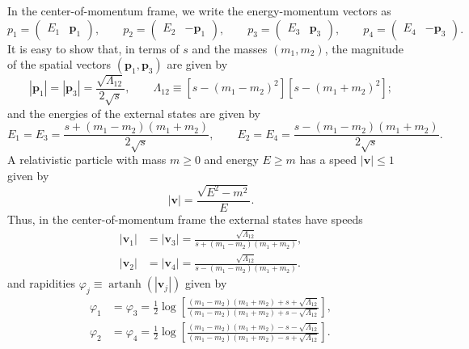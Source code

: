 In the center-of-momentum frame, we write the energy-momentum vectors as
\begin{equation}
	p_{1} = \begin{pmatrix} E_{1} & \mathbf{p}_{1} \end{pmatrix}, \qquad p_{2} = \begin{pmatrix} E_{2} & -\mathbf{p}_{1} \end{pmatrix}, \qquad p_{3} = \begin{pmatrix} E_{3} & \mathbf{p}_{3} \end{pmatrix}, \qquad p_{4} = \begin{pmatrix} E_{4} & -\mathbf{p}_{3} \end{pmatrix}.
\end{equation}
It is easy to show that, in terms of $s$ and the masses $(m_{1}, m_{2})$, the magnitude of the spatial vectors $(\mathbf{p}_{1}, \mathbf{p}_{3})$ are given by
\begin{equation}
	|\mathbf{p}_{1}| = |\mathbf{p}_{3}| = \frac{\sqrt{\Lambda_{12}}}{2 \sqrt{s}}, \qquad \Lambda_{12} \equiv \left[s - (m_{1} - m_{2})^{2} \right] \left[s - (m_{1} + m_{2})^{2} \right];
	\label{2Momenta}
\end{equation}
and the energies of the external states are given by
\begin{equation}
	E_{1} = E_{3} = \frac{s + (m_{1} - m_{2})(m_{1} + m_{2})}{2 \sqrt{s}}, \qquad E_{2} = E_{4} = \frac{s - (m_{1} - m_{2})(m_{1} + m_{2})}{2 \sqrt{s}}.
	\label{4Energies}
\end{equation}
A relativistic particle with mass $m \geq 0$ and energy $E \geq m$ has a speed $|\mathbf{v}| \leq 1$ given by
\begin{equation}
	|\mathbf{v}| = \frac{\sqrt{E^{2} - m^{2}}}{E}.
\end{equation}
Thus, in the center-of-momentum frame the external states have speeds
\begin{equation}
\begin{split}
	|\mathbf{v}_{1}| &= |\mathbf{v}_{3}| = \frac{\sqrt{\Lambda_{12}}}{s + (m_{1} - m_{2})(m_{1} + m_{2})}, \\
	|\mathbf{v}_{2}| &= |\mathbf{v}_{4}| = \frac{\sqrt{\Lambda_{12}}}{s - (m_{1} - m_{2})(m_{1} + m_{2})}.
\end{split} \label{4Speeds}
\end{equation}
and rapidities $\varphi_{j} \equiv \operatorname{artanh}{(|\mathbf{v}_{j}|)}$ given by
\begin{equation}
\begin{split}
	\varphi_{1} &= \varphi_{3} = \frac{1}{2} \log{\left[ \frac{(m_{1} - m_{2})(m_{1} + m_{2}) + s + \sqrt{\Lambda_{12}}}{(m_{1} - m_{2})(m_{1} + m_{2}) + s - \sqrt{\Lambda_{12}}} \right]}, \\
	\varphi_{2} &= \varphi_{4} = \frac{1}{2} \log{\left[ \frac{(m_{1} - m_{2})(m_{1} + m_{2}) - s - \sqrt{\Lambda_{12}}}{(m_{1} - m_{2})(m_{1} + m_{2}) - s + \sqrt{\Lambda_{12}}} \right]}.
\end{split} \label{4Rapidities}
\end{equation}
